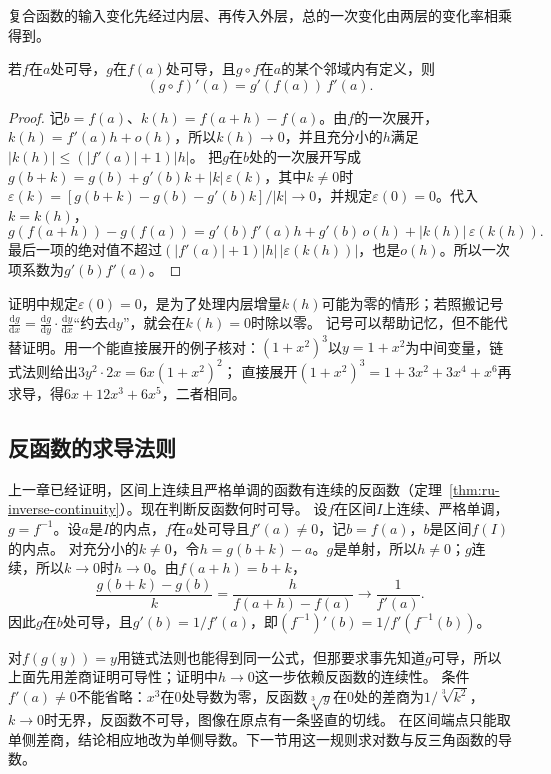复合函数的输入变化先经过内层、再传入外层，总的一次变化由两层的变化率相乘得到。
\begin{theorem}[链式法则]
\label{thm:ru-chain-rule}
若$f$在$a$处可导，$g$在$f(a)$处可导，且$g\circ f$在$a$的某个邻域内有定义，则
\begin{equation}
 (g\circ f)'(a)=g'(f(a))\,f'(a).
 \label{eq:analysis-scalar-chain-rule}
\end{equation}
\end{theorem}
\begin{proof}
记$b=f(a)$、$k(h)=f(a+h)-f(a)$。由$f$的一次展开，$k(h)=f'(a)h+o(h)$，所以$k(h)\to0$，并且充分小的$h$满足$|k(h)|\leq(|f'(a)|+1)|h|$。
把$g$在$b$处的一次展开写成$g(b+k)=g(b)+g'(b)k+|k|\,\varepsilon(k)$，其中$k\neq0$时$\varepsilon(k)=[g(b+k)-g(b)-g'(b)k]/|k|\to0$，并规定$\varepsilon(0)=0$。代入$k=k(h)$，
\[
 g(f(a+h))-g(f(a))=g'(b)f'(a)h+g'(b)\,o(h)+|k(h)|\,\varepsilon(k(h)).
\]
最后一项的绝对值不超过$(|f'(a)|+1)|h|\,|\varepsilon(k(h))|$，也是$o(h)$。所以一次项系数为$g'(b)f'(a)$。
\end{proof}
证明中规定$\varepsilon(0)=0$，是为了处理内层增量$k(h)$可能为零的情形；若照搬记号$\frac{\mathrm dg}{\mathrm dx}=\frac{\mathrm dg}{\mathrm dy}\cdot\frac{\mathrm dy}{\mathrm dx}$“约去$\mathrm dy$”，就会在$k(h)=0$时除以零。
记号可以帮助记忆，但不能代替证明。用一个能直接展开的例子核对：$(1+x^2)^3$以$y=1+x^2$为中间变量，链式法则给出$3y^2\cdot2x=6x(1+x^2)^2$；
直接展开$(1+x^2)^3=1+3x^2+3x^4+x^6$再求导，得$6x+12x^3+6x^5$，二者相同。

\subsection{反函数的求导法则}
\label{sec:ru-inverse-derivative}

上一章已经证明，区间上连续且严格单调的函数有连续的反函数（定理~\ref{thm:ru-inverse-continuity}）。现在判断反函数何时可导。
设$f$在区间$I$上连续、严格单调，$g=f^{-1}$。设$a$是$I$的内点，$f$在$a$处可导且$f'(a)\neq0$，记$b=f(a)$，$b$是区间$f(I)$的内点。
对充分小的$k\neq0$，令$h=g(b+k)-a$。$g$是单射，所以$h\neq0$；$g$连续，所以$k\to0$时$h\to0$。由$f(a+h)=b+k$，
\[
 \frac{g(b+k)-g(b)}k=\frac h{f(a+h)-f(a)}\to\frac1{f'(a)}.
\]
因此$g$在$b$处可导，且$g'(b)=1/f'(a)$，即$(f^{-1})'(b)=1/f'(f^{-1}(b))$。

对$f(g(y))=y$用链式法则也能得到同一公式，但那要求事先知道$g$可导，所以上面先用差商证明可导性；证明中$h\to0$这一步依赖反函数的连续性。
条件$f'(a)\neq0$不能省略：$x^3$在$0$处导数为零，反函数$\sqrt[3]y$在$0$处的差商为$1/\sqrt[3]{k^2}$，$k\to0$时无界，反函数不可导，图像在原点有一条竖直的切线。
在区间端点只能取单侧差商，结论相应地改为单侧导数。下一节用这一规则求对数与反三角函数的导数。

